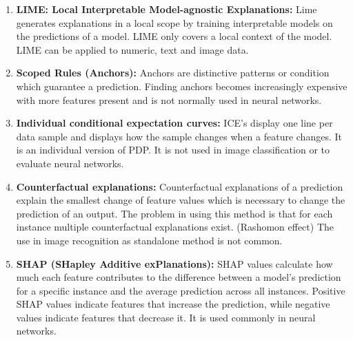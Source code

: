 \begin{enumerate}
	\item \textbf{LIME: Local Interpretable Model-agnostic Explanations:} Lime generates explanations in a local scope by training interpretable models on the predictions of a model. LIME only covers a local context of the model. LIME can be applied to numeric, text and image data.
	\item \textbf{Scoped Rules (Anchors):} Anchors are distinctive patterns or condition which guarantee a prediction. Finding anchors becomes increasingly expensive with more features present and is not normally used in neural networks. \cite{ribeiro2018}
	\item \textbf{Individual conditional expectation curves:} ICE's display one line per data sample and displays how the sample changes when a feature changes. It is an individual version of PDP. \cite{goldstein2014peeking} It is not used in image classification or to evaluate neural networks.
	\item \textbf{Counterfactual explanations:} Counterfactual explanations of a prediction explain the smallest change of feature values which is necessary to change the prediction of an output. The problem in using this method is that for each instance multiple counterfactual explanations exist. (Rashomon effect) The use in image recognition as standalone method is not common.
	\item \textbf{SHAP (SHapley Additive exPlanations):} SHAP values \cite{lundberg2017unified} calculate how much each feature contributes to the difference between a model's prediction for a specific instance and the average prediction across all instances. Positive SHAP values indicate features that increase the prediction, while negative values indicate features that decrease it. It is used commonly in neural networks.
\end{enumerate}


